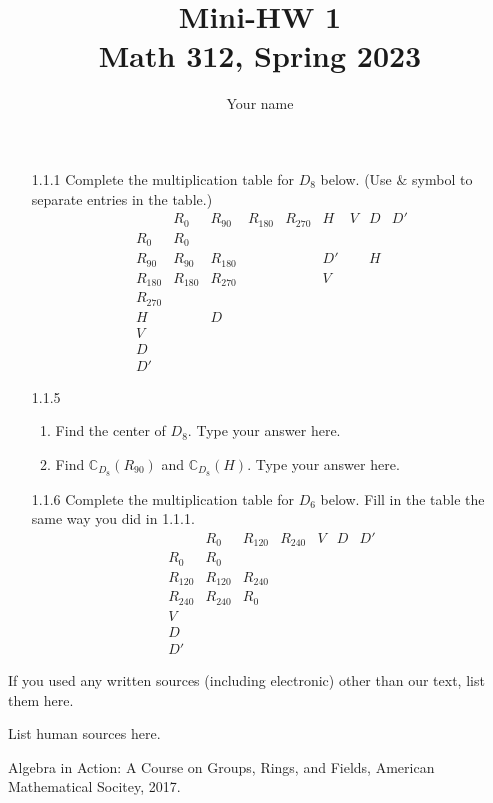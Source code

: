 \documentclass[12pt]{amsart}
\newcommand{\CC}{\ensuremath{\mathbb{C}}}
\theoremstyle{definition}
\begin{document}
\title{Mini-HW 1\\Math 312, Spring 2023}
\author{Your name}

\maketitle


\begin{enumerate}
\item[1.1.1]  Complete the multiplication table for $D_8$ below.  (Use $\&$ symbol to separate entries in the table.)
\[\begin{array}{c|cccccccc}
&R_0 & R_{90} & R_{180} & R_{270} & H & V & D & D'\\
\hline
R_0 & R_0\\
R_{90} & R_{90} & R_{180} & & & D' & & H\\
R_{180} & R_{180} & R_{270} & & & V\\
R_{270}\\
H & & D\\
V\\
D\\
D'

\end{array}
\]
\item[1.1.5]
\begin{enumerate}
\item Find the center of $D_8.$  Type your answer here.
\item Find $\CC_{D_8}(R_{90})$ and $\CC_{D_8}(H)$.  Type your answer here.
\end{enumerate}

\item[1.1.6]  Complete the multiplication table for $D_6$ below.  Fill in the table the same way you did in 1.1.1.
\[\begin{array}{c|cccccc}
&R_0 & R_{120} & R_{240} &V & D& D' \\
\hline
R_0 & R_0\\
R_{120} & R_{120} & R_{240} & \\
R_{240} & R_{240} & R_0 & \\
V\\
D\\
D'

\end{array}
\]

\end{enumerate}

\begin{thebibliography}{99}
 If you used any written sources (including electronic) other than our text, list them here.

  List human sources here.

  Algebra in Action: A Course on Groups, Rings, and Fields, American Mathematical Socitey, 2017.
\end{thebibliography}
\end{document}
